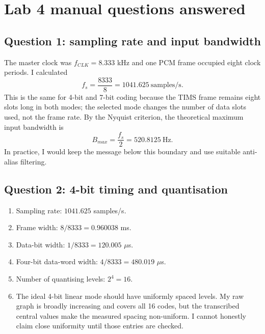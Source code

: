 \documentclass[11pt,a4paper]{article}
\begin{document}
\FloatBarrier
\section{Lab 4 manual questions answered}

\subsection{Question 1: sampling rate and input bandwidth}
\begin{answerbox}
The master clock was $f_{CLK}=8.333$ kHz and one PCM frame occupied eight clock periods. I calculated
\[
 f_s=\frac{8333}{8}=1041.625\ \text{samples/s}.
\]
This is the same for 4-bit and 7-bit coding because the TIMS frame remains eight slots long in both modes; the selected mode changes the number of data slots used, not the frame rate. By the Nyquist criterion, the theoretical maximum input bandwidth is
\[
 B_{max}=\frac{f_s}{2}=520.8125\ \text{Hz}.
\]
In practice, I would keep the message below this boundary and use suitable anti-alias filtering.
\end{answerbox}

\subsection{Question 2: 4-bit timing and quantisation}
\begin{answerbox}
\begin{enumerate}[label=(\alph*)]
\item Sampling rate: $1041.625$ samples/s.
\item Frame width: $8/8333=0.960038$ ms.
\item Data-bit width: $1/8333=120.005$ $\mu$s.
\item Four-bit data-word width: $4/8333=480.019$ $\mu$s.
\item Number of quantising levels: $2^4=16$.
\item The ideal 4-bit linear mode should have uniformly spaced levels. My raw graph is broadly increasing and covers all 16 codes, but the transcribed central values make the measured spacing non-uniform. I cannot honestly claim close uniformity until those entries are checked.
\end{enumerate}
\end{answerbox}
\end{document}
